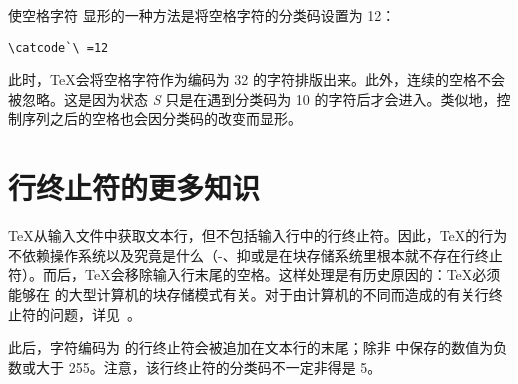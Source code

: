 \documentclass{book}
\begin{document}
使空格字符 \textvisiblespace 显形的一种方法是将空格字符的分类码设置为 12：
\begin{verbatim}
\catcode`\ =12
\end{verbatim}
此时，\TeX 会将空格字符作为编码为 32 的字符排版出来。此外，连续的空格不会被忽略。这是因为状态 {\itshape S} 只是在遇到分类码为 10 的字符后才会进入。类似地，控制序列之后的空格也会因分类码的改变而显形。

\section{行终止符的更多知识}

\TeX 从输入文件中获取文本行，但不包括输入行中的行终止符。因此，\TeX 的行为不依赖操作系统以及究竟是什么（-、抑或是在块存储系统里根本就不存在行终止符）。而后，\TeX 会移除输入行末尾的空格。这样处理是有历史原因的：\TeX 必须能够在  的大型计算机的块存储模式有关。对于由计算机的不同而造成的有关行终止符的问题，详见~\cite{B:ctrl-M}。

此后，字符编码为  的行终止符会被追加在文本行的末尾；除非  中保存的数值为负数或大于 255。注意，该行终止符的分类码不一定非得是 5。
\end{document}
